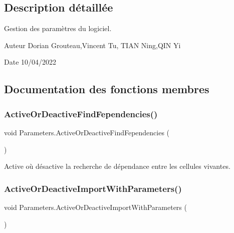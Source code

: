 \subsection{Description détaillée}
Gestion des paramètres du logiciel. 

\begin{DoxyAuthor}{Auteur}
Dorian Grouteau,Vincent Tu, T\+I\+AN Ning,Q\+IN Yi 
\end{DoxyAuthor}
\begin{DoxyDate}{Date}
10/04/2022 
\end{DoxyDate}


\subsection{Documentation des fonctions membres}
\mbox{\label{class_parameters_a23cd831787b627f7ec96da88a774838d}} 
\subsubsection{\texorpdfstring{Active\+Or\+Deactive\+Find\+Fependencies()}{ActiveOrDeactiveFindFependencies()}}
{\footnotesize\ttfamily void Parameters.\+Active\+Or\+Deactive\+Find\+Fependencies (\begin{DoxyParamCaption}{ }\end{DoxyParamCaption})\hspace{0.3cm}{\ttfamily [inline]}}



Active où désactive la recherche de dépendance entre les cellules vivantes. 

\mbox{\label{class_parameters_a4566221c7993c122d2d32682530f1083}} 
\subsubsection{\texorpdfstring{Active\+Or\+Deactive\+Import\+With\+Parameters()}{ActiveOrDeactiveImportWithParameters()}}
{\footnotesize\ttfamily void Parameters.\+Active\+Or\+Deactive\+Import\+With\+Parameters (\begin{DoxyParamCaption}{ }\end{DoxyParamCaption})\hspace{0.3cm}{\ttfamily [inline]}}



